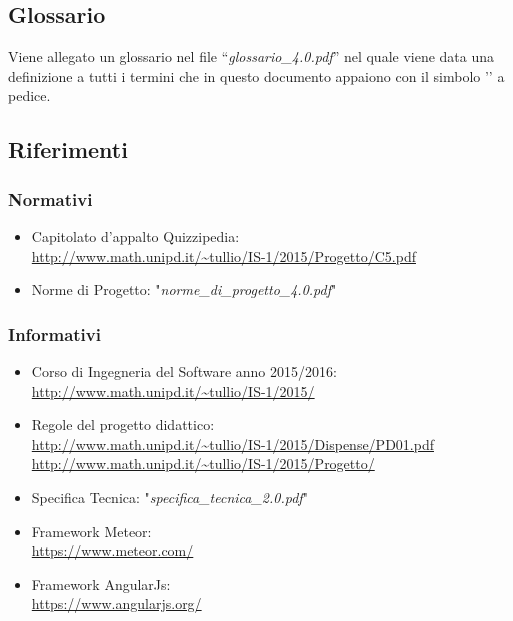 \documentclass[a4paper,11pt]{article}
\begin{document}
	\subsection{Glossario}
	Viene allegato un glossario nel file ``\textit{glossario\_4.0.pdf}'' nel quale viene data una definizione a tutti i termini che in questo documento appaiono con il simbolo '\addglos' a pedice.
	\subsection{Riferimenti}
		\subsubsection{Normativi}

		\begin{itemize}
			\item Capitolato d'appalto Quizzipedia:\\
			\url{http://www.math.unipd.it/~tullio/IS-1/2015/Progetto/C5.pdf}
			\item Norme di Progetto: "\textit{norme\_di\_progetto\_4.0.pdf}"
		\end{itemize}
		\subsubsection{Informativi}
		\begin{itemize}
			\item Corso di Ingegneria del Software anno 2015/2016:\\
			\url{http://www.math.unipd.it/~tullio/IS-1/2015/}
			\item Regole del progetto didattico:\\
			\url{http://www.math.unipd.it/~tullio/IS-1/2015/Dispense/PD01.pdf}\\
			\url{http://www.math.unipd.it/~tullio/IS-1/2015/Progetto/}
			\item Specifica Tecnica: "\textit{specifica\_tecnica\_2.0.pdf}"
			\item Framework Meteor:\\
			\url{https://www.meteor.com/}
			\item Framework AngularJs:\\
			\url{https://www.angularjs.org/}
		\end{itemize}
	\pagebreak
	\newpage
	
	\newpage
	
	\newpage
	
	\newpage
	
\end{document}
